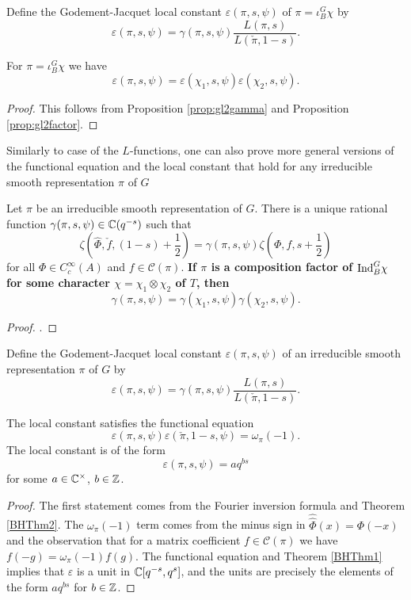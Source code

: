 \begin{defn}
    Define the Godement-Jacquet local constant $\varepsilon(\pi,s,\psi)$ of $\pi = \iota_B^G \chi$ by 
    $$\varepsilon(\pi,s,\psi) = \gamma(\pi,s,\psi) \frac{L(\pi,s)}{L(\check{\pi},1-s)}.$$
\end{defn}

\begin{cor}
    For $\pi= \iota_B^G \chi$ we have
    $$\varepsilon(\pi,s,\psi) = \varepsilon(\chi_1,s,\psi)\varepsilon(\chi_2,s,\psi).$$
\end{cor}
\begin{proof}
    This follows from Proposition \ref{prop:gl2gamma} and Proposition \ref{prop:gl2factor}.
\end{proof}

Similarly to case of the $L$-functions, one can also prove more general versions of the functional equation and the local constant that hold for any irreducible smooth representation $\pi$ of $G$


\begin{thm}\label{BHThm2}
    Let $\pi$ be an irreducible smooth representation of $G$. There is a unique rational function $\gamma(\pi,s,\psi) \in \mathbb{C}(q^{-s})$ such that 
    $$\zeta(\hat\Phi,\check{f},(1-s)+\frac{1}{2}) = \gamma(\pi,s,\psi) \zeta(\Phi,f,s+\frac{1}{2})$$ for all $\Phi \in C_c^\infty(A)$ and $f \in \mathcal C(\pi)$. \textbf{If $\pi$ is a composition factor of $\mathrm{Ind}_B^G\chi$ for some character $\chi=\chi_1\otimes\chi_2$ of $T$, then
    $$\gamma(\pi,s,\psi)=\gamma(\chi_1,s,\psi)\gamma(\chi_2,s,\psi).$$
    }
\end{thm}
\begin{proof}
    \cite[Theorem 24.2.2]{BH1}.
\end{proof}

\begin{defn}
    Define the Godement-Jacquet local constant $\varepsilon(\pi,s,\psi)$ of an irreducible smooth representation $\pi$ of $G$ by 
    $$\varepsilon(\pi,s,\psi) = \gamma(\pi,s,\psi) \frac{L(\pi,s)}{L(\check{\pi},1-s)}.$$
\end{defn}

\begin{cor}
    The local constant satisfies the functional equation
    $$\varepsilon(\pi,s,\psi)\varepsilon(\check{\pi},1-s,\psi) = \omega_\pi(-1).$$
    The local constant is of the form $$\varepsilon(\pi,s,\psi) = aq^{bs}$$ for some $a \in \mathbb{C}^\times$, $b \in \mathbb{Z}$. 
\end{cor}
\begin{proof}
    The first statement comes from the Fourier inversion formula and Theorem \ref{BHThm2}. The $\omega_\pi(-1)$ term comes from the minus sign in $\hat{\hat{\Phi}}(x)=\Phi(-x)$ and the observation that for a matrix coefficient $f \in \mathcal C(\pi)$ we have $f(-g)=\omega_\pi(-1)f(g)$. The functional equation and Theorem \ref{BHThm1} implies that $\varepsilon$ is a unit in $\mathbb{C}[q^{-s},q^s]$, and the units are precisely the elements of the form $aq^{bs}$ for $b \in \mathbb{Z}$.
\end{proof}

